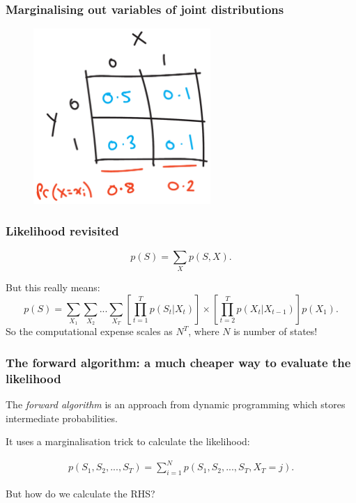\documentclass[main.tex]{subfiles}
\begin{document}
\begin{frame}
\frametitle{Marginalising out variables of joint distributions}

		
\begin{figure}[ht]
    \centerline{\includegraphics[width=0.6\textwidth]{./figures/horse_race_marginal.pdf}}
\end{figure}
    
\end{frame}

\begin{frame}
\frametitle{Likelihood revisited}

\begin{equation}
    p(S) = \sum_X p(S,X).
\end{equation}

But this really means:
%
\begin{equation}
    p(S) = \sum_{X_1}\sum_{X_2}...\sum_{X_T}\left[\prod_{t=1}^T p(S_t | X_t)\right] \times \left[\prod_{t=2}^T p(X_t | X_{t-1})\right] p(X_1).
\end{equation}
%
So the computational expense scales as $N^T$, where $N$ is number of states!
    
\end{frame}

\begin{frame}
\frametitle{The forward algorithm: a much cheaper way to evaluate the likelihood}

The \textit{forward algorithm} is an approach from dynamic programming which stores intermediate probabilities.

\vspace{0.5cm}

It uses a marginalisation trick to calculate the likelihood:

\begin{equation}
    \begin{aligned}
    p(S_1, S_2, ..., S_T) = \sum_{i=1}^N p(S_1, S_2, ..., S_T, X_T=j).
    \end{aligned}
\end{equation}

\vspace{0.5cm}

But how do we calculate the RHS?
    
\end{frame}
\end{document}
